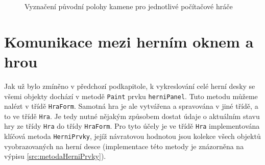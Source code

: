 \begin{figure}
	\centering
	\hspace{1em} %
		\hspace{1em} %
		\hspace{1em} %
		\hspace{1em} %
	\caption{Vyznačení původní polohy kamene pro jednotlivé počítačové hráče}
	\label{fig:VychoziPole}
\end{figure}

\section{Komunikace mezi herním oknem a hrou}
Jak už bylo zmíněno v předchozí podkapitole, k vykreslování celé herní desky se všemi objekty dochází v metodě \lstinline$Paint$ prvku \lstinline$herniPanel$. Tuto metodu můžeme nalézt v třídě \lstinline$HraForm$. Samotná hra je ale vytvářena a spravována v jiné třídě, a to ve třídě \lstinline$Hra$. Je tedy nutné nějakým způsobem dostat údaje o aktuálním stavu hry ze třídy \lstinline$Hra$ do třídy \lstinline$HraForm$. Pro tyto účely je ve třídě \lstinline$Hra$ implementována klíčová metoda \lstinline$HerniPrvky$, jejíž návratovou hodnotou jsou kolekce všech objektů vyobrazovaných na herní desce (implementace této metody je znázorněna na výpisu \ref{src:metodaHerniPrvky}).

